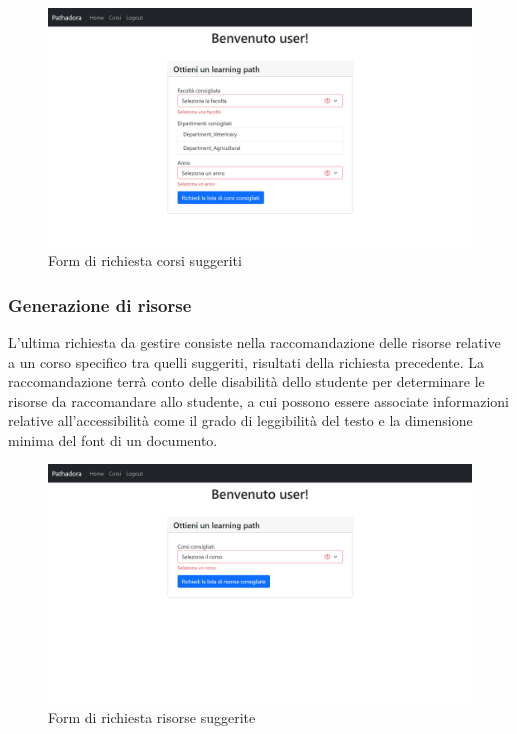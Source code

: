 \begin{figure}[H]
\centering
\includegraphics[scale=0.4]{res/courses-generation.png}
\caption{Form di richiesta corsi suggeriti}
\label{fig:courses-generation}
\end{figure}

\subsubsection{Generazione di risorse}
L'ultima richiesta da gestire consiste nella raccomandazione delle risorse relative a un corso specifico tra quelli suggeriti, risultati della richiesta precedente.
La raccomandazione terrà conto delle disabilità dello studente per determinare le risorse da raccomandare allo studente, a cui possono essere associate informazioni relative all'accessibilità come il grado di leggibilità del testo e la dimensione minima del font di un documento.

\begin{figure}[H]
\centering
\includegraphics[scale=0.4]{res/resources-generation.png}
\caption{Form di richiesta risorse suggerite}
\label{fig:resources-generation}
\end{figure}


